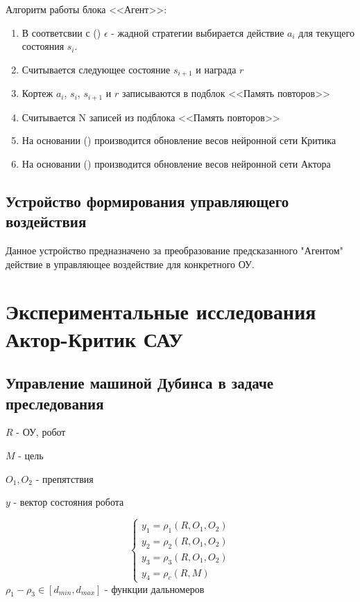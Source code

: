 Алгоритм работы блока <<Агент>>:
\begin{enumerate}
	\item В соответсвии с () $ \epsilon $ - жадной стратегии выбирается действие $ a_i $ для текущего состояния $ s_i $.
	\item Считывается следующее состояние $ s_{i+1} $ и награда $ r $
	\item Кортеж $ a_i $, $ s_i $, $ s_{i+1} $ и $ r $ записываются в подблок <<Память повторов>>
	\item Считывается N записей из подблока <<Память повторов>>
	\item На основании () производится обновление весов нейронной сети Критика
	\item На основании () производится обновление весов нейронной сети Актора
\end{enumerate}

\subsection{Устройство формирования управляющего воздействия} \label{subsect2_2_5}
Данное устройство предназначено за преобразование предсказанного "Агентом" действие в управляющее воздействие для конкретного ОУ.


\section{Экспериментальные исследования Актор-Критик САУ} \label{sect2_3}

\subsection{Управление машиной Дубинса в задаче преследования} \label{subsect2_3_1}

$ R $ - ОУ, робот

$ M $ - цель

$ O_1, O_2 $ - препятствия

$ y $ - вектор состояния робота

$$
\begin{cases}
y_1 = \rho_1(R, O_1, O_2) \\
y_2 = \rho_2(R, O_1, O_2) \\
y_3 = \rho_3(R, O_1, O_2) \\
y_4 = \rho_c(R, M)
\end{cases}
$$
\newpage
$ \rho_1 - \rho_3 \in [d_{min}, d_{max}] $ - функции дальномеров 

